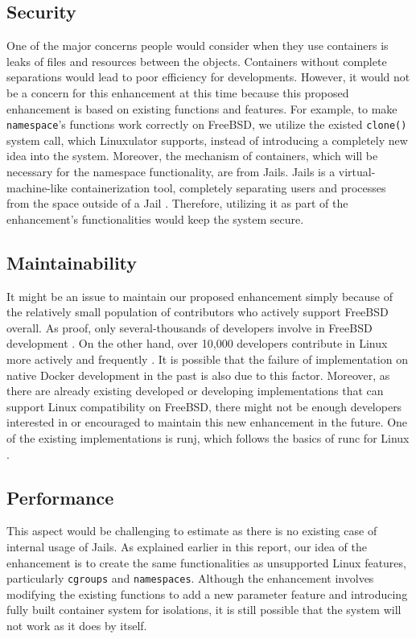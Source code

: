\documentclass[12pt, dvipsnames, a4paper]{article}
\begin{document}
\subsection{Security}
One of the major concerns people would consider when they use containers is leaks of files and resources between the objects. Containers without complete separations would lead to poor efficiency for developments. However, it would not be a concern for this enhancement at this time because this proposed enhancement is based on existing functions and features. For example, to make \texttt{namespace}'s functions work correctly on FreeBSD, we utilize the existed \texttt{clone()} system call, which Linuxulator supports, instead of introducing a completely new idea into the system. Moreover, the mechanism of containers, which will be necessary for the namespace functionality, are from Jails. Jails is a virtual-machine-like containerization tool, completely separating users and processes from the space outside of a Jail \cite{jail}. Therefore, utilizing it as part of the enhancement's functionalities would keep the system secure.

\subsection{Maintainability}
It might be an issue to maintain our proposed enhancement simply because of the relatively small population of contributors who actively support FreeBSD overall. As proof, only several-thousands of developers involve in FreeBSD development \cite{freebsd}. On the other hand, over 10,000 developers contribute in Linux more actively and frequently \cite{linux}. It is possible that the failure of implementation on native Docker development in the past is also due to this factor. Moreover, as there are already existing developed or developing implementations that can support Linux compatibility on FreeBSD, there might not be enough developers interested in or encouraged to maintain this new enhancement in the future. One of the existing implementations is runj, which follows the basics of runc for Linux \cite{runj}.

\subsection{Performance}
This aspect would be challenging to estimate as there is no existing case of internal usage of Jails. As explained earlier in this report, our idea of the enhancement is to create the same functionalities as unsupported Linux features, particularly \texttt{cgroups} and \texttt{namespaces}. Although the enhancement involves modifying the existing functions to add a new parameter feature and introducing fully built container system for isolations, it is still possible that the system will not work as it does by itself.
\end{document}
